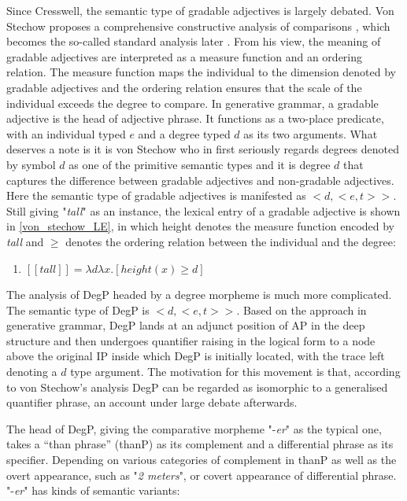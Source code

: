 \documentclass{ctexart}
\let \cite \parencite
\begin{document}
\noindent
Since Cresswell, the semantic type of gradable adjectives is largely debated. Von Stechow proposes a comprehensive constructive analysis of comparisons \cite{von1984a}, which becomes the so-called standard analysis later \cite{bale2011}. From his view, the meaning of gradable adjectives are interpreted as a measure function and an ordering relation. The measure function maps the individual to the dimension denoted by gradable adjectives and the ordering relation ensures that the scale of the individual exceeds the degree to compare. In generative grammar, a gradable adjective is the head of adjective phrase. It functions as a two-place predicate, with an individual typed $e$ and a degree typed $d$ as its two arguments. What deserves a note is it is von Stechow who in first seriously regards degrees denoted by symbol $d$ as one of the primitive semantic types and it is degree $d$ that captures the difference between gradable adjectives and non-gradable adjectives. Here the semantic type of gradable adjectives is manifested as $<d,<e,t>>$. Still giving "\textit{tall}" as an instance, the lexical entry of a gradable adjective is shown in \ref{von_stechow_LE}, in which height denotes the measure function encoded by \textit{tall} and $\geq$ denotes the ordering relation between the individual and the degree:

\begin{enumerate}
    \item \label{von_stechow_LE} $[\![tall]\!] = \lambda d \lambda x. [height(x) \geq d]$
\end{enumerate}

\noindent
The analysis of DegP headed by a degree morpheme is much more complicated. The semantic type of DegP is $<d,<e,t>>$. Based on the approach in generative grammar, DegP lands at an adjunct position of AP in the deep structure and then undergoes quantifier raising in the logical form to a node above the original IP inside which DegP is initially located, with the trace left denoting a $d$ type argument. The motivation for this movement is that, according to von Stechow’s analysis DegP can be regarded as isomorphic to a generalised quantifier phrase, an account under large debate afterwards.

The head of DegP, giving the comparative morpheme "-\textit{er}" as the typical one, takes a “than phrase” (thanP) as its complement and a differential phrase as its specifier. Depending on various categories of complement in thanP as well as the overt appearance, such as "\textit{2 meters}", or covert appearance of differential phrase. "-\textit{er}" has kinds of semantic variants:
\end{document}
